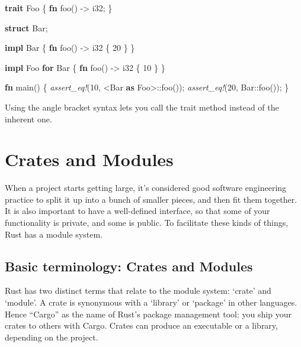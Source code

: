 \documentclass[a4paper,]{book}
\renewcommand*{\hypertarget}[3][\ar]{%
  \def\ar{#2}%
  \label{#1}%
  #3}
\newenvironment{Shaded}{\begin{snugshade}}{\end{snugshade}}
\newcommand{\KeywordTok}[1]{\textcolor[rgb]{0.13,0.29,0.53}{\textbf{{#1}}}}
\newcommand{\DataTypeTok}[1]{\textcolor[rgb]{0.13,0.29,0.53}{{#1}}}
\newcommand{\DecValTok}[1]{\textcolor[rgb]{0.00,0.00,0.81}{{#1}}}
\newcommand{\PreprocessorTok}[1]{\textcolor[rgb]{0.56,0.35,0.01}{\textit{{#1}}}}
\newcommand{\NormalTok}[1]{{#1}}
\begin{document}
\begin{Shaded}
\begin{Highlighting}[]
\KeywordTok{trait} \NormalTok{Foo \{}
    \KeywordTok{fn} \NormalTok{foo() -> }\DataTypeTok{i32}\NormalTok{;}
\NormalTok{\}}

\KeywordTok{struct} \NormalTok{Bar;}

\KeywordTok{impl} \NormalTok{Bar \{}
    \KeywordTok{fn} \NormalTok{foo() -> }\DataTypeTok{i32} \NormalTok{\{}
        \DecValTok{20}
    \NormalTok{\}}
\NormalTok{\}}

\KeywordTok{impl} \NormalTok{Foo }\KeywordTok{for} \NormalTok{Bar \{}
    \KeywordTok{fn} \NormalTok{foo() -> }\DataTypeTok{i32} \NormalTok{\{}
        \DecValTok{10}
    \NormalTok{\}}
\NormalTok{\}}

\KeywordTok{fn} \NormalTok{main() \{}
    \PreprocessorTok{assert_eq!}\NormalTok{(}\DecValTok{10}\NormalTok{, <Bar }\KeywordTok{as} \NormalTok{Foo>::foo());}
    \PreprocessorTok{assert_eq!}\NormalTok{(}\DecValTok{20}\NormalTok{, Bar::foo());}
\NormalTok{\}}
\end{Highlighting}
\end{Shaded}

Using the angle bracket syntax lets you call the trait method instead of
the inherent one.

\hypertarget{sec--crates-and-modules}{\section{Crates and
Modules}\label{sec--crates-and-modules}}

When a project starts getting large, it's considered good software
engineering practice to split it up into a bunch of smaller pieces, and
then fit them together. It is also important to have a well-defined
interface, so that some of your functionality is private, and some is
public. To facilitate these kinds of things, Rust has a module system.

\subsection{Basic terminology: Crates and
Modules}\label{basic-terminology-crates-and-modules}

Rust has two distinct terms that relate to the module system: `crate'
and `module'. A crate is synonymous with a `library' or `package' in
other languages. Hence ``Cargo'' as the name of Rust's package
management tool: you ship your crates to others with Cargo. Crates can
produce an executable or a library, depending on the project.
\end{document}
